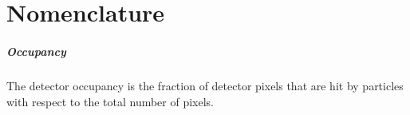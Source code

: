\chapter*{Nomenclature} 

\paragraph{Occupancy}
The detector occupancy is the fraction of detector pixels that are hit by particles with respect to the total number of pixels.